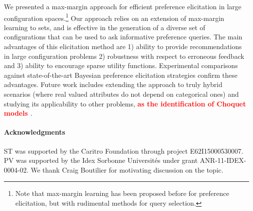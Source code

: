 \documentclass{article}
\renewcommand\[{\begin{equation}}
\renewcommand\]{\end{equation}}
\newcommand{\paolo}[1]{{\bf \textcolor{red}{{\fbox{Paolo:} #1}}}}
\begin{document}
We presented a max-margin approach for efficient preference
elicitation in large configuration spaces.\footnote{Note that max-margin learning has been proposed before \cite{gajos2005} for preference elicitation, 
but with  rudimental methods for query selection.}
Our approach relies on an
extension of max-margin learning to sets, and is effective in the
generation of a diverse set of configurations that can be used to ask
informative preference queries.  The main advantages of this
elicitation method are 1) ability to provide recommendations in large
configuration problems 2) robustness with respect to erroneous
feedback and 3) ability to encourage sparse utility functions.
Experimental comparisons against state-of-the-art Bayesian preference
elicitation strategies confirm these advantages. Future work includes
extending the approach to truly hybrid scenarios (where real valued
attributes do not depend on categorical ones) and studying its
applicability to other problems, \paolo{as the identification of Choquet models \cite{Pine2013}}.

\paragraph{Acknowledgments}
ST was supported by the Caritro Foundation through project E62I15000530007.
PV was supported by the Idex Sorbonne Universit\'{e}s under grant ANR-11-IDEX-0004-02.
We thank Craig Boutilier for motivating discussion on the topic.





\end{document}
